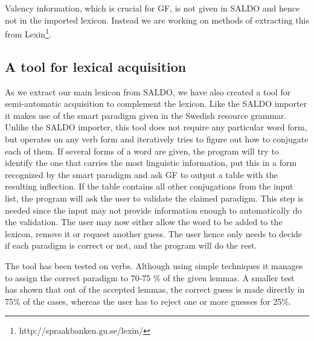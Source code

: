 \documentclass[10pt, a4paper]{article}
\begin{document}
Valency information, which is crucial for GF, is not given in SALDO and
hence not in the imported lexicon. Instead we are working on methods
of extracting this from
Lexin\footnote{http://spraakbanken.gu.se/lexin/}.


\subsection{A tool for lexical acquisition}
As we extract our main lexicon from SALDO, we have also created a tool for
semi-automatic acquisition to complement the lexicon.
Like the SALDO importer it makes use of
the smart paradigm given in the Swedish resource grammar.
Unlike the SALDO importer, this tool does not require any particular
word form, but operates on any verb form and 
iteratively tries to figure out how to conjugate each of them. If several forms
of a word are 
given, the program will try to identify the one that carries the most linguistic
information, put this in a form recognized by the smart paradigm and ask GF to output
a table with the resulting inflection. 
If the table contains all other conjugations from the input list,
the program will ask the  user to
validate the claimed paradigm. 
This step is needed since the input may not provide information enough
to automatically do the validation. The user may now either
allow the word to be added to the lexicon, remove it or request another guess.
The user hence only needs to decide if each paradigm is correct or not, and
the program will do the rest.

The tool has been tested on verbs. Although using simple techniques it 
manages to assign the correct paradigm to 70-75 \% of the given lemmas.
A smaller test has shown that out of the accepted lemmas, the correct guess is
made directly in 75\% of the cases, whereas the user has to reject one or more
guesses for 25\%. 


\end{document}
